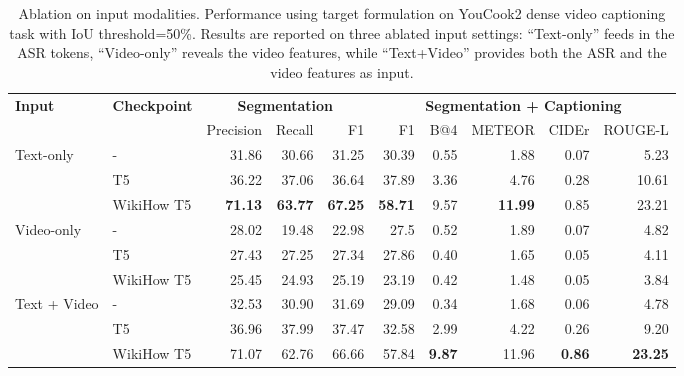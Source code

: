 \documentclass[11pt]{article}
\begin{document}
\begin{table*}[tbp]
\begin{adjustbox}{width=0.8\linewidth,center}
\begin{tabular}{l  l | r r r | r r r r r}
\cmidrule[\heavyrulewidth]{1-10}
\multirow{2}{*}{\textbf{Input}}    & \multirow{2}{*}{\textbf{Checkpoint}}  &    \multicolumn{3}{c}{\textbf{Segmentation}}  &   \multicolumn{5}{|c}{\textbf{Segmentation + Captioning}} \\
\cmidrule{3-10}
   &    &  Precision  & Recall    &   F1  &     F1  &   B@4    &   METEOR  &   CIDEr   &   ROUGE-L \\ 
\cmidrule[\heavyrulewidth]{1-10}

\multirow{3}{*}{Text-only}
    &   -               & 31.86	 & 	30.66	 & 	31.25	 & 	30.39	 & 	0.55	 & 	1.88	 & 	0.07	 & 	5.23\\ 
    &   T5              & 36.22	 & 	37.06	 & 	36.64	 & 	37.89	 & 	3.36	 & 	4.76	 & 	0.28	 & 	10.61\\ 
    &   WikiHow T5      & \textbf{71.13}	 & 	\textbf{63.77}	 & 	\textbf{67.25}	 & 	\textbf{58.71}	 & 	9.57	 & 	\textbf{11.99}	 & 	0.85	 & 	23.21\\ 
\cmidrule{1-10}
	
\multirow{3}{*}{Video-only}
    &   -               & 28.02	 & 	19.48	 & 	22.98	 & 	27.5	 & 	0.52	 & 	1.89	 & 	0.07	 & 	4.82\\ 
    &   T5              & 27.43	 & 	27.25	 & 	27.34	 & 	27.86	 & 	0.40	 & 	1.65	 & 	0.05	 & 	4.11\\ 
    &   WikiHow T5      	 & 25.45	 & 	24.93	 & 	25.19	 & 	23.19	 & 	0.42	 & 	1.48	 & 	0.05	 & 	3.84\\ 
\cmidrule{1-10}


\multirow{3}{*}{Text + Video}
    &   -               & 32.53	 & 	30.90	 & 	31.69	 & 	29.09	 & 	0.34	 & 	1.68	 & 	0.06	 & 	4.78\\ 
    &   T5              & 36.96	 & 	37.99	 & 	37.47	 & 	32.58	 & 	2.99	 & 	4.22	 & 	0.26	 & 	9.20\\ 
    &   WikiHow T5      	 & 71.07	 & 	62.76	 & 	66.66	 & 	57.84	 & 	\textbf{9.87}	 & 	11.96	 & 	\textbf{0.86}	 & 	\textbf{23.25}\\ 
\cmidrule[\heavyrulewidth]{1-10}
\end{tabular}
\end{adjustbox}
\caption{Ablation on input modalities.  Performance using \offsetbased target formulation on YouCook2 dense video captioning task with IoU threshold=50\%. Results are reported on three ablated input settings: ``Text-only'' feeds in the ASR tokens,  ``Video-only'' reveals the video features, while ``Text+Video'' provides both the ASR and the video features as input.}
\label{tab:ablation_input_source}
\end{table*}
\end{document}
